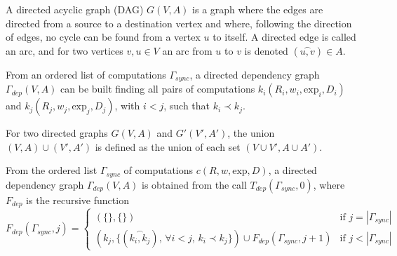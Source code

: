 

\begin{mydef}
A directed acyclic graph (DAG) $G(V,A)$ is a graph where the edges are directed from a source to a destination vertex and where, following the direction of edges, no cycle can be found from a vertex $u$ to itself. A directed edge is called an arc, and for two vertices $v,u \in V$ an arc from $u$ to $v$ is denoted $(\overset{\frown}{u,v}) \in A$.
\end{mydef}

From an ordered list of computations $\Gamma_{sync}$, a directed dependency graph $\Gamma_{dep}(V,A)$ can be built finding all pairs of computations $k_i(R_i,w_i,\text{exp}_i,D_i)$ and $k_j(R_j,w_j,\text{exp}_j,D_j)$, with $i<j$, such that $k_i \prec k_j$. %

\begin{mydef}
For two directed graphs $G(V,A)$ and $G'(V',A')$, the union $(V,A)\cup (V',A')$ is defined as the union of each set $(V\cup V', A \cup A')$.
\end{mydef}

\begin{mydef}
From the ordered list $\Gamma_{sync}$ of computations $c(R,w,\text{exp},D)$, a directed dependency graph $\Gamma_{dep}(V,A)$ is obtained from the call $T_{dep}(\Gamma_{sync},0)$, where $F_{dep}$ is the recursive function
\begin{equation*}
F_{dep}(\Gamma_{sync},j) = 
\begin{cases} 	(\{\},\{\}) & \mbox{if }j=|\Gamma_{sync}|\\
				(k_j, \{(\overset{\frown}{k_i,k_j})\mbox{, }\forall i < j \mbox{, } k_i\prec k_j \})\cup F_{dep}(\Gamma_{sync},j+1) & \mbox{if }j<|\Gamma_{sync}|
\end{cases}
\end{equation*}
\end{mydef}

